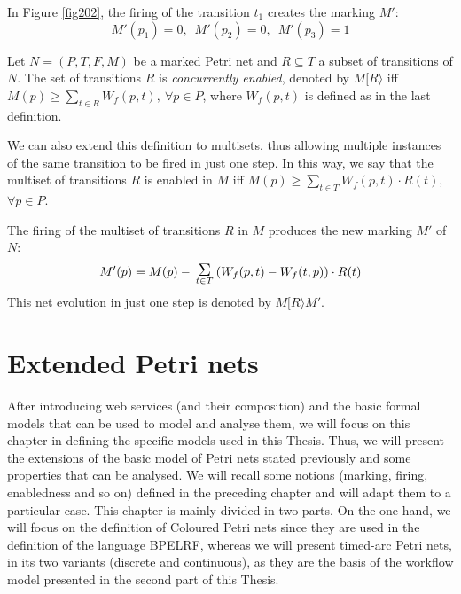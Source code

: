 \begin{example} In Figure \ref{fig202}, the firing of the transition $t_1$
creates the marking $M'$:
\[ M'(p_1) = 0,\,\,\,M'(p_2)=0,\,\,\,M'(p_3)=1 \]
\end{example}

\begin{definition} 
Let $N= (P,T,F,M)$ be a marked Petri net and $R \subseteq T$ a subset of transitions of $N$.
The set of transitions $R$ is \emph{concurrently enabled}, denoted by $M [ R \rangle$
iff $M(p) \geq \sum_{t \in R} W_f(p,t),~
\forall p\in P$, where
$W_f(p,t)$ is defined as in the last definition.

We can also extend this definition to multisets, thus allowing
multiple instances of the same transition to be fired in just one step.
In this way, we say that the multiset of transitions $R$ 
is enabled in $M$ iff $M(p)
\geq \sum_{t \in T} W_f(p,t) \cdot R(t)$, $\forall p \in P$.

The firing of the multiset of transitions $R$ in $M$ 
produces the new marking $M'$ of $N$:
\[ M'(p) = M(p) - \sumas{t \in T} (W_f(p,t) - W_f(t,p)) \cdot R(t)\]
This net evolution in just one step is denoted by
$M[ R \rangle M'$.
\end{definition}

\chapter{Extended Petri nets}\label{chapter:extended}
After introducing web services (and their composition) and the basic formal models
that can be used to model and analyse them, we will focus on this chapter in defining the specific models used in this Thesis. Thus, we
will present the extensions of the basic model of Petri nets stated previously and some properties
that can be analysed. We will recall some notions (marking, firing, enabledness and so on) defined in the preceding chapter
and will adapt them to a particular case. This chapter is mainly divided in two parts. On the one hand,
we will focus on the definition of Coloured Petri nets since they are used in the definition of the language BPELRF, whereas
we will present timed-arc Petri nets, in its two variants (discrete and continuous), as they are the basis of the workflow model presented in the
second part of this Thesis.

